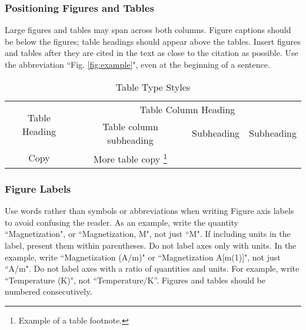 \documentclass[conference]{IEEEtran}
\renewcommand\footnoterule{\vspace*{-3pt}%
     \hrule width 2in height 0.4pt
     \vspace*{2.6pt}}
\begin{document}
\subsubsection{Positioning Figures and Tables}

Large figures and tables may span across both columns. Figure captions should be below the figures; table headings should appear above the tables. Insert figures and tables after they are cited in the text as close to the citation as possible. Use the abbreviation ``Fig. \ref{fig:example}", even at the beginning of a sentence.


\begin{table}[!ht]
\renewcommand{\arraystretch}{1.2}
%
\caption{Table Type Styles}
\label{tab:example}
\noindent
\centering
    \begin{minipage}{\linewidth} %
    \renewcommand\footnoterule{\vspace*{-5pt}} %
    \begin{center}
        \begin{tabular}{c c c c}
            \toprule
            \multirow{2}{*}{Table Heading} & \multicolumn{3}{c}{Table Column Heading} \\
            \cline{2-4}
             & Table column subheading & Subheading & Subheading \\
            \midrule
            Copy & More table copy \footnote{Example of a table footnote.} & &\\
            \bottomrule
        \end{tabular}
        \end{center}
    \end{minipage}
\end{table}

\subsubsection{Figure Labels}
Use words rather than symbols or abbreviations when writing Figure axis labels to avoid confusing the reader. As an example, write the quantity ``Magnetization", or ``Magnetization, M", not just ``M". If including units in the label, present them within parentheses. Do not label axes only with units. In the example, write ``Magnetization (A/m)" or ``Magnetization {A[m(1)]}", not just ``A/m". Do not label axes with a ratio of quantities and units. For example, write ``Temperature (K)", not ``Temperature/K”.
Figures and tables should be numbered consecutively.
\end{document}
